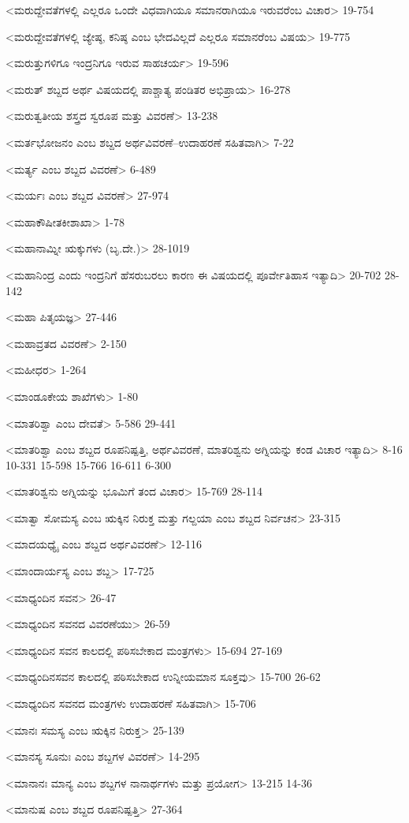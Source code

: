 <ಮರುದ್ದೇವತೆಗಳಲ್ಲಿ ಎಲ್ಲರೂ ಒಂದೇ ವಿಧವಾಗಿಯೂ ಸಮಾನರಾಗಿಯೂ ಇರುವರೆಂಬ ವಿಚಾರ>
19-754

<ಮರುದ್ದೇವತೆಗಳಲ್ಲಿ ಜ್ಯೇಷ್ಠ, ಕನಿಷ್ಠ ಎಂಬ ಭೇದವಿಲ್ಲದೆ ಎಲ್ಲರೂ ಸಮಾನರೆಂಬ ವಿಷಯ>
19-775

<ಮರುತ್ತುಗಳಿಗೂ ಇಂದ್ರನಿಗೂ ಇರುವ ಸಾಹಚರ್ಯ>
19-596

<ಮರುತ್‍ ಶಬ್ದದ ಅರ್ಥ ವಿಷಯದಲ್ಲಿ ಪಾಶ್ಚಾತ್ಯ ಪಂಡಿತರ ಅಭಿಪ್ರಾಯ>
16-278

<ಮರುತ್ವತೀಯ ಶಸ್ತ್ರದ ಸ್ವರೂಪ ಮತ್ತು ವಿವರಣೆ>
13-238

<ಮರ್ತಭೋಜನಂ ಎಂಬ ಶಬ್ದದ ಅರ್ಥವಿವರಣೆ–ಉದಾಹರಣೆ ಸಹಿತವಾಗಿ>
7-22

<ಮರ್ತ್ಯ ಎಂಬ ಶಬ್ದದ ವಿವರಣೆ>
6-489

<ಮರ್ಯಃ ಎಂಬ ಶಬ್ದದ ವಿವರಣೆ>
27-974

<ಮಹಾಕೌಷೀತಕೀಶಾಖಾ>
1-78

<ಮಹಾನಾಮ್ನೀ ಋಕ್ಕುಗಳು (ಬೃ.ದೇ.)>
28-1019

<ಮಹಾನಿಂದ್ರ ಎಂದು ಇಂದ್ರನಿಗೆ ಹೆಸರುಬರಲು ಕಾರಣ ಈ ವಿಷಯದಲ್ಲಿ ಪೂರ್ವೇತಿಹಾಸ ಇತ್ಯಾದಿ>
20-702
28-142

<ಮಹಾ ಪಿತೃಯಜ್ಞ>
27-446

<ಮಹಾವ್ರತದ ವಿವರಣೆ>
2-150

<ಮಹೀಧರ>
1-264

<ಮಾಂಡೂಕೇಯ ಶಾಖೆಗಳು>
1-80

<ಮಾತರಿಶ್ವಾ ಎಂಬ ದೇವತೆ>
5-586
29-441

<ಮಾತರಿಶ್ವಾ ಎಂಬ ಶಬ್ದದ ರೂಪನಿಷ್ಪತ್ತಿ, ಅರ್ಥವಿವರಣೆ, ಮಾತರಿಶ್ವನು ಅಗ್ನಿಯನ್ನು ಕಂಡ ವಿಚಾರ ಇತ್ಯಾದಿ>
8-16
10-331 
15-598
15-766 
16-611
6-300

<ಮಾತರಿಶ್ವನು ಅಗ್ನಿಯನ್ನು ಭೂಮಿಗೆ ತಂದ ವಿಚಾರ>
15-769
28-114

<ಮಾತ್ವಾ ಸೋಮಸ್ಯ ಎಂಬ ಋಕ್ಕಿನ ನಿರುಕ್ತ ಮತ್ತು ಗಲ್ದಯಾ ಎಂಬ ಶಬ್ದದ ನಿರ್ವಚನ>
23-315

<ಮಾದಯಧ್ಯೈ ಎಂಬ ಶಬ್ದದ ಅರ್ಥವಿವರಣೆ>
12-116

<ಮಾಂದಾರ್ಯಸ್ಯ ಎಂಬ ಶಬ್ದ>
17-725

<ಮಾಧ್ಯಂದಿನ ಸವನ>
26-47

<ಮಾಧ್ಯಂದಿನ ಸವನದ ವಿವರಣೆಯು>
26-59

<ಮಾಧ್ಯಂದಿನ ಸವನ ಕಾಲದಲ್ಲಿ ಪಠಿಸಬೇಕಾದ ಮಂತ್ರಗಳು>
15-694
27-169

<ಮಾಧ್ಯಂದಿನಸವನ ಕಾಲದಲ್ಲಿ ಪಠಿಸಬೇಕಾದ ಉನ್ನೀಯಮಾನ ಸೂಕ್ತವು>
15-700
26-62

<ಮಾಧ್ಯಂದಿನ ಸವನದ ಮಂತ್ರಗಳು ಉದಾಹರಣೆ ಸಹಿತವಾಗಿ>
15-706

<ಮಾನಃ ಸಮಸ್ಯ ಎಂಬ ಋಕ್ಕಿನ ನಿರುಕ್ತ>
25-139


<ಮಾನಸ್ಯ ಸೂನುಃ ಎಂಬ ಶಬ್ದಗಳ ವಿವರಣೆ>
14-295

<ಮಾನಾನಃ ಮಾನ್ಯ ಎಂಬ ಶಬ್ದಗಳ ನಾನಾರ್ಥಗಳು ಮತ್ತು ಪ್ರಯೋಗ>
13-215
14-36

<ಮಾನುಷ ಎಂಬ ಶಬ್ದದ ರೂಪನಿಷ್ಪತ್ತಿ>
27-364

